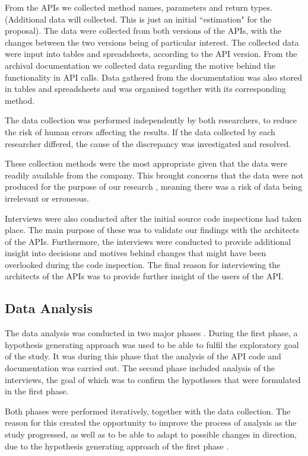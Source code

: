\documentclass[10pt,twocolumn]{article}
\begin{document}
From the APIs we collected method names, parameters and return types. (Additional data will collected. This is just an initial ``estimation" for the proposal). The data were collected from both versions of the APIs, with the changes between the two versions being of particular interest. The collected data were input into tables and spreadsheets, according to the API version. From the archival documentation we collected data regarding the motive behind the functionality in API calls. Data gathered from the documentation was also stored in tables and spreadsheets and was organised together with its corresponding method.

The data collection was performed independently by both researchers, to reduce the risk of human errors affecting the results. If the data collected by each researcher differed, the cause of the discrepancy was investigated and resolved. 

These collection methods were the most appropriate given that the data were readily available from the company. This brought concerns that the data were not produced for the purpose of our research \cite{runeson2009guidelines}, meaning there was a risk of data being irrelevant or erroneous. 

Interviews were also conducted after the initial source code inspections had taken place. The main purpose of these was to validate our findings with the architects of the APIs. Furthermore, the interviews were conducted to provide additional insight into decisions and motives behind changes that might have been overlooked during the code inspection. The final reason for interviewing the architects of the APIs was to provide further insight of the users of the API. 



\subsection{Data Analysis}
The data analysis was conducted in two major phases \cite{andersson2007spiral}. During the first phase, a hypothesis generating approach \cite{seaman1999qualitative} was used to be able to fulfil the exploratory goal of the study. It was during this phase that the analysis of the API code and documentation was carried out. The second phase included analysis of the interviews, the goal of which was to confirm the hypotheses \cite{seaman1999qualitative} that were formulated in the first phase.  

Both phases were performed iteratively, together with the data collection. The reason for this created the opportunity to improve the process of analysis as the study progressed, as well as to be able to adapt to possible changes in direction, due to the hypothesis generating approach of the first phase \cite{andersson2007spiral}. 
\end{document}
